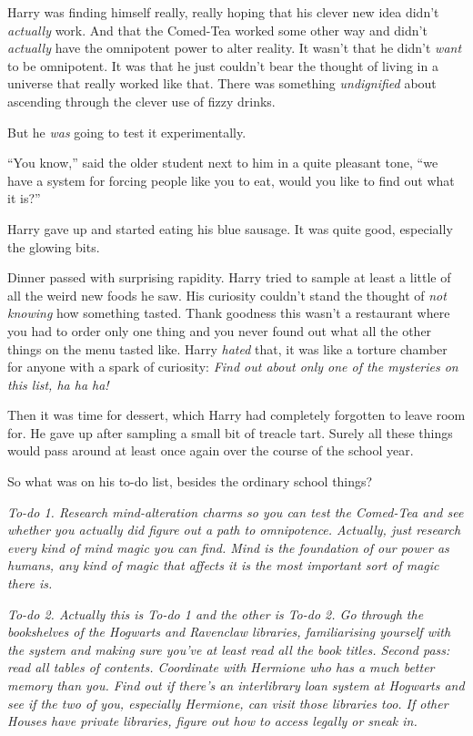 Harry was finding himself really, really hoping that his clever new idea didn’t \emph{actually} work. And that the Comed-Tea worked some other way and didn’t \emph{actually} have the omnipotent power to alter reality. It wasn’t that he didn’t \emph{want} to be omnipotent. It was that he just couldn’t bear the thought of living in a universe that really worked like that. There was something \emph{undignified} about ascending through the clever use of fizzy drinks.

But he \emph{was} going to test it experimentally.

“You know,” said the older student next to him in a quite pleasant tone, “we have a system for forcing people like you to eat, would you like to find out what it is?”

Harry gave up and started eating his blue sausage. It was quite good, especially the glowing bits.

Dinner passed with surprising rapidity. Harry tried to sample at least a little of all the weird new foods he saw. His curiosity couldn’t stand the thought of \emph{not knowing} how something tasted. Thank goodness this wasn’t a restaurant where you had to order only one thing and you never found out what all the other things on the menu tasted like. Harry \emph{hated} that, it was like a torture chamber for anyone with a spark of curiosity: \emph{Find out about only one of the mysteries on this list, ha ha ha!}

Then it was time for dessert, which Harry had completely forgotten to leave room for. He gave up after sampling a small bit of treacle tart. Surely all these things would pass around at least once again over the course of the school year.

So what was on his to-do list, besides the ordinary school things?

\emph{To-do 1. Research mind-alteration charms so you can test the Comed-Tea and see whether you actually did figure out a path to omnipotence. Actually, just research every kind of mind magic you can find. Mind is the foundation of our power as humans, any kind of magic that affects it is the most important sort of magic there is.}

\emph{To-do 2. Actually this is To-do 1 and the other is To-do 2. Go through the bookshelves of the Hogwarts and Ravenclaw libraries, familiarising yourself with the system and making sure you’ve at least read all the book titles. Second pass: read all tables of contents. Coordinate with Hermione who has a much better memory than you. Find out if there’s an interlibrary loan system at Hogwarts and see if the two of you, especially Hermione, can visit those libraries too. If other Houses have private libraries, figure out how to access legally or sneak in.}

